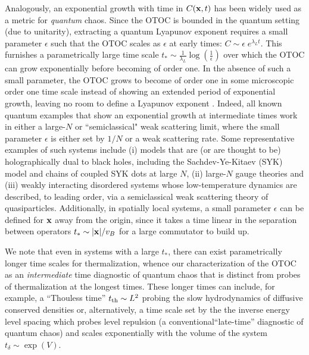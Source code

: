\documentclass[aps,prl,reprint,superscriptaddress, longbibliography]{revtex4-1}
\newcommand{\vb}{v_B}
\begin{document}
Analogously, an exponential growth with time in ${C}({\bf x},t)$ has been widely used as a metric for \emph{quantum} chaos. Since the OTOC is bounded in the quantum setting (due to unitarity), extracting a quantum Lyapunov exponent requires a small parameter $\epsilon$ such that the OTOC scales as $\epsilon$ at early times: ${C \sim \epsilon\; e^{\lambda_L t}}$. This furnishes a parametrically large time scale ${t_* \sim \frac{1}{\lambda_L}\log(\frac{1}{\epsilon})}$ over which the OTOC can grow exponentially before becoming of order one. In the absence of such a small parameter, the OTOC grows to become of order one in some microscopic order one time scale instead of showing an extended period of exponential growth, leaving no room to define a Lyapunov exponent \cite{chaosbound}. Indeed, all known quantum examples that show an exponential growth at intermediate times work in either a large-$N$ or ``semiclassical" weak scattering limit, where the small parameter $\epsilon$ is either set by $1/N$ or a weak scattering rate\cite{KitaevSYK, ShenkerStanfordButterfly,LocalizedShocks,CotlerRM,RobertsStanford,GuQiStanford,StanfordWeakCoupling,PatelDiffusiveMetal,ChowdhuryON,AleinerOTOC}. Some representative examples of such systems include (i) models that are (or are thought to be) holographically dual to black holes\cite{ShenkerStanfordButterfly,LocalizedShocks,CotlerRM}, including the Sachdev-Ye-Kitaev (SYK) model\cite{SachdevSYK, KitaevSYK} and chains of coupled SYK dots at large $N$\cite{GuQiStanford},
(ii) large-$N$ gauge theories\cite{StanfordWeakCoupling,RobertsStanford,ChowdhuryON} and (iii) weakly interacting disordered systems whose low-temperature dynamics are described, to leading order, via a semiclassical weak scattering theory of quasiparticles\cite{PatelDiffusiveMetal}. Additionally, in spatially local systems, a small parameter $\epsilon$ can be defined for ${\bf x}$ away from the origin, since it takes a time linear in the separation between operators $ t_* \sim|{\bf x}|/\vb$ for a large commutator to build up. 



We note that even in systems with a large $t_*$, there can exist parametrically longer time scales for thermalization, whence our characterization of the OTOC as an \emph{intermediate} time diagnostic of quantum chaos that is distinct from probes of thermalization at the longest times. These longer times can include, for example,  a  ``Thouless time'' $t_{\rm th} \sim L^2$ probing the slow hydrodynamics of diffusive conserved densities or, alternatively, a time scale set by the the inverse energy level spacing which probes level repulsion (a conventional``late-time'' diagnostic of quantum chaos) and scales exponentially with the volume of the system $t_\delta \sim \exp(V)$.  
\end{document}
